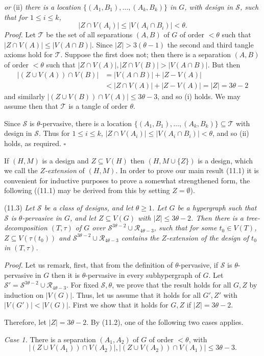 \noindent \textit{or} (ii) \textit{there is a location $\{(A_1, B_1), \dots, (A_k, B_k)\}$ in $G$, with design in $\mathscr{S}$, such that for $1 \le i \le k$,}
\begin{equation*}
|Z \cap V(A_i)| \le |V(A_i \cap B_i)| < \theta.
\end{equation*}
\textit{Proof.} Let $\mathscr{T}$ be the set of all separations $(A, B)$ of $G$ of order $< \theta$ such that $|Z \cap V(A)| \le |V(A \cap B)|$. Since $|Z| > 3(\theta - 1)$ the second and third tangle axioms hold for $\mathscr{T}$. Suppose the first does not; then there is a separation $(A, B)$ of order $< \theta$ such that $|Z \cap V(A)|, |Z \cap V(B)| > |V(A \cap B)|$. But then
\begin{align*}
|(Z \cup V(A)) \cap V(B)| &= |V(A \cap B)| + |Z - V(A)| \\
&< |Z \cap V(A)| + |Z - V(A)| = |Z| = 3\theta - 2
\end{align*}
and similarly $|(Z \cup V(B)) \cap V(A)| \le 3\theta - 3$, and so (i) holds. We may assume then that $\mathscr{T}$ is a tangle of order $\theta$.

Since $\mathscr{S}$ is $\theta$-pervasive, there is a location $\{(A_1, B_1), \dots, (A_k, B_k)\} \subseteq \mathscr{T}$ with design in $\mathscr{S}$. Thus for $1 \le i \le k$, $|Z \cap V(A_i)| \le |V(A_i \cap B_i)| < \theta$, and so (ii) holds, as required. $\square$

If $(H, M)$ is a design and $Z \subseteq V(H)$ then $(H, M \cup \{Z\})$ is a design, which we call the \textit{$Z$-extension} of $(H, M)$. In order to prove our main result (11.1) it is convenient for inductive purposes to prove a somewhat strengthened form, the following ((11.1) may be derived from this by setting $Z = \emptyset$).

\stmt
(11.3) \textit{Let $\mathscr{S}$ be a class of designs, and let $\theta \ge 1$. Let $G$ be a hypergraph such that $\mathscr{S}$ is $\theta$-pervasive in $G$, and let $Z \subseteq V(G)$ with $|Z| \le 3\theta - 2$. Then there is a tree-decomposition $(T, \tau)$ of $G$ over $\mathscr{S}^{3\theta - 2} \cup \mathscr{R}_{4\theta - 3}$, such that for some $t_0 \in V(T)$, $Z \subseteq V(\tau(t_0))$ and $\mathscr{S}^{3\theta - 2} \cup \mathscr{R}_{4\theta - 3}$ contains the $Z$-extension of the design of $t_0$ in $(T, \tau)$.}

\textit{Proof.} Let us remark, first, that from the definition of $\theta$-pervasive, if $\mathscr{S}$ is $\theta$-pervasive in $G$ then it is $\theta$-pervasive in every subhypergraph of $G$. Let $\mathscr{S}' = \mathscr{S}^{3\theta - 2} \cup \mathscr{R}_{4\theta - 3}$. For fixed $\mathscr{S}, \theta$, we prove that the result holds for all $G, Z$ by induction on $|V(G)|$. Thus, let us assume that it holds for all $G', Z'$ with $|V(G')| < |V(G)|$. First we show that it holds for $G, Z$ if $|Z| = 3\theta - 2$.

Therefore, let $|Z| = 3\theta - 2$. By (11.2), one of the following two cases applies.

\textit{Case 1.} There is a separation $(A_1, A_2)$ of $G$ of order $< \theta$, with
\begin{equation*}
|(Z \cup V(A_1)) \cap V(A_2)|, |(Z \cup V(A_2)) \cap V(A_1)| \le 3\theta - 3.
\end{equation*}
